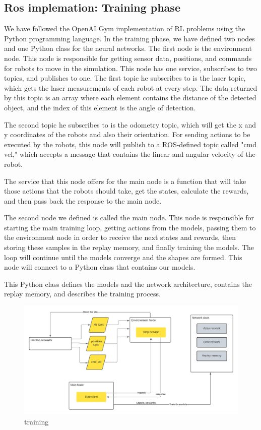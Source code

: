 \documentclass[12pt]{extarticle}
\begin{document}
\subsection{Ros implemation: Training phase}

We have followed the OpenAI Gym implementation of RL problems using the Python programming language.
In the training phase, we have defined two nodes and one Python class for the neural networks.
The first node is the environment node. This node is responsible for getting sensor data, positions, and commands for robots to move in the simulation.
This node has one service, subscribes to two topics, and publishes to one. The first topic he subscribes to is the laser topic, which gets the laser measurements of each robot at every step. The data returned by this topic is an array where each element contains the distance of the detected object, and the index of this element is the angle of detection.

The second topic he subscribes to is the odometry topic, which will get the x and y coordinates of the robots and also their orientation. For sending actions to be executed by the robots, this node will publish to a ROS-defined topic called "cmd vel," which accepts a message that contains the linear and angular velocity of the robot.

The service that this node offers for the main node is a function that will take those actions that the robots should take, get the states, calculate the rewards, and then pass back the response to the main node.


The second node we defined is called the main node. This node is responsible for starting the main training loop, getting actions from the models, passing them to the environment node in order to receive the next states and rewards, then storing these samples in the replay memory, and finally training the models. The loop will continue until the models converge and the shapes are formed. This node will connect to a Python class that contains our models.

This Python class defines the models and the network architecture, contains the replay memory, and describes the training process.





 \begin{figure}[h]  
\centering
\includegraphics[scale=0.6]{training}
\caption[training phase]{training}
\end{figure}
\end{document}
